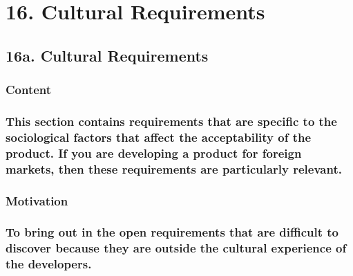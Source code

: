 \documentclass[
]{article}
\begin{document}
\hypertarget{cultural-requirements}{%
\section{16. Cultural Requirements}\label{cultural-requirements}}

\hypertarget{a.-cultural-requirements}{%
\subsection{16a. Cultural Requirements}\label{a.-cultural-requirements}}

\hypertarget{content-57}{%
\subsubsection{Content}\label{content-57}}

\hypertarget{this-section-contains-requirements-that-are-specific-to-the-sociological-factors-that-affect-the-acceptability-of-the-product.-if-you-are-developing-a-product-for-foreign-markets-then-these-requirements-are-particularly-relevant.}{%
\subsubsection{This section contains requirements that are specific to
the sociological factors that affect the acceptability of the product.
If you are developing a product for foreign markets, then these
requirements are particularly
relevant.}\label{this-section-contains-requirements-that-are-specific-to-the-sociological-factors-that-affect-the-acceptability-of-the-product.-if-you-are-developing-a-product-for-foreign-markets-then-these-requirements-are-particularly-relevant.}}

\hypertarget{motivation-56}{%
\subsubsection{Motivation}\label{motivation-56}}

\hypertarget{to-bring-out-in-the-open-requirements-that-are-difficult-to-discover-because-they-are-outside-the-cultural-experience-of-the-developers.}{%
\subsubsection{\texorpdfstring{To bring out in the open requirements
that are difficult to discover because they are outside the cultural
experience of the developers.
}{To bring out in the open requirements that are difficult to discover because they are outside the cultural experience of the developers. }}\label{to-bring-out-in-the-open-requirements-that-are-difficult-to-discover-because-they-are-outside-the-cultural-experience-of-the-developers.}}
\end{document}
